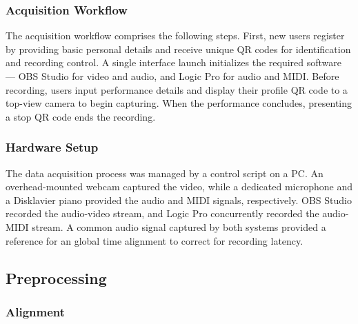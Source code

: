 \documentclass{article}
\begin{document}
\subsubsection{Acquisition Workflow}
The acquisition workflow comprises the following steps. First, new users register by providing basic personal details and receive unique QR codes for identification and recording control. A single interface launch initializes the required software — OBS Studio for video and audio, and Logic Pro for audio and MIDI. Before recording, users input performance details and display their profile QR code to a top-view camera to begin capturing. When the performance concludes, presenting a stop QR code ends the recording.


\subsubsection{Hardware Setup} 
The data acquisition process was managed by a control script on a PC. An overhead-mounted webcam captured the video, while a dedicated microphone and a Disklavier piano provided the audio and MIDI signals, respectively. OBS Studio recorded the audio-video stream, and Logic Pro concurrently recorded the audio-MIDI stream. A common audio signal captured by both systems provided a reference for an global time alignment to correct for recording latency. %

\subsection{Preprocessing}
\subsubsection{Alignment}\label{subsubsec:alignment}
\end{document}
